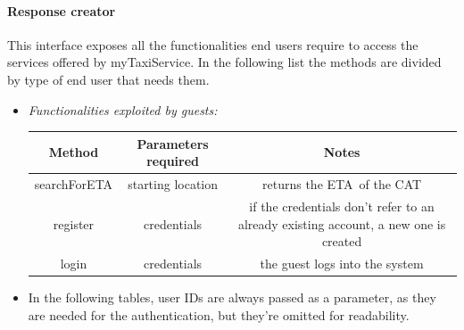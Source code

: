 \documentclass{article}
\begin{document}
\paragraph{Response creator}
This interface exposes all the functionalities end users require to access the services offered by myTaxiService. 
In the following list the methods are divided by type of end user that needs them. 
\begin{itemize}
	\item \textit{Functionalities exploited by guests:}	\\
	\begin{table}[H]
		\begin{adjustbox}{width=1.2\textwidth}
			\begin{tabular}{*{3}{c}}
				\toprule
				Method & Parameters required & Notes \\
				\midrule
				searchForETA & starting location & returns the ETA\footnotemark\  of the CAT\footnotemark\\ %
				register & credentials & if the credentials don't refer to an already existing account, a new one is created \\
				login & credentials & the guest logs into the system \\
				\bottomrule
			\end{tabular}
	\end{adjustbox}
\end{table}

	\item In the following tables, user IDs are always passed as a parameter, as they are needed for the authentication, but they're omitted for readability. \\	


\end{itemize}
\end{document}
